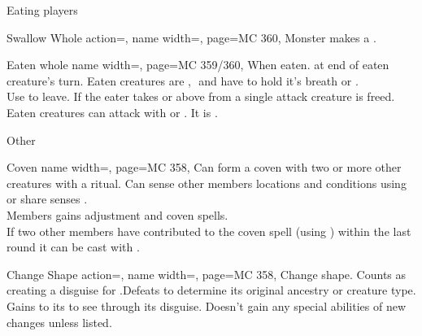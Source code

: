 \begin{PageFront}
\begin{Table}{Eating players}
\begin{entry}{Swallow Whole}{%
            action=,
            name width=\monsterLength,
            page=MC 360,%
        }
            Monster makes a \AthleticsReflex.  \hfill {}\\
        \end{entry}
        \begin{entry}{Eaten whole}{%
            name width=\monsterLength,
            page=MC 359/360,%
        }
              When eaten.  at end of eaten creature's turn. \hfill Eaten creatures are \Grabbed,\,\Slowed\, and have to hold it's breath or .\\
            Use  to leave. \hfill If the eater takes  or  above  from a single attack creature is freed.\\
            Eaten creatures can attack with  or \LightBulk. It is \OffGuard.
        \end{entry}

    \end{Table}
    \begin{Table}{Other}
        \begin{entry}{Coven}{%
            name width=\monsterLength,
            page=MC 358,%
        }
            Can form a coven with two or more other creatures with a  ritual. \hfill Can sense other members locations and conditions using  or share senses  \Concentrate.\\
            Members gains  adjustment and coven spells. \hfill {} \\
            If two other members have contributed to the coven spell (using  \Concentrate) within the last round it can be cast with  \Concentrate.
        \end{entry}
        \begin{entry}{Change Shape}{%
            action=,
            name width=\monsterLength,
            page=MC 358,%
        }
            \Concentrate \Polymorph Change shape. Counts as creating a disguise for .\hfill  Defeats \Perception to determine its original ancestry or creature type.\\
            Gains  \Cirm to its \Deception to see through its disguise. Doesn't gain any special abilities of new changes unless listed. \hfill
        \end{entry}
    \end{Table}

\end{PageFront}